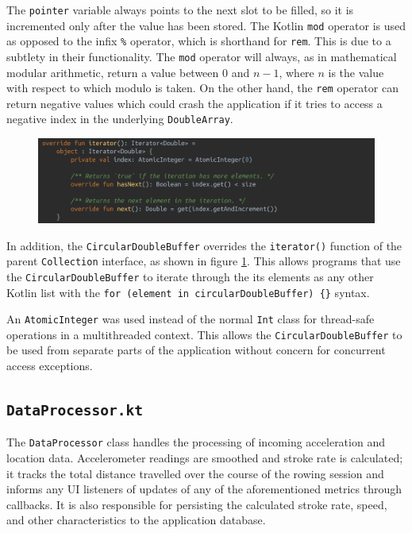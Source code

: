 \documentclass[11pt,twoside,a4paper]{report}
\newcommand\invisiblesection[1]{%
  \refstepcounter{section}%
  \addcontentsline{toc}{section}{\protect\numberline{\thesection}#1}%
  \sectionmark{#1}}
\begin{document}
The \texttt{pointer} variable always points to the next slot to be filled, so it is incremented only after the value has been stored. The Kotlin \texttt{mod} operator is used as opposed to the infix \texttt{\%} operator, which is shorthand for \texttt{rem}. This is due to a subtlety in their functionality. The \texttt{mod} operator will always, as in mathematical modular arithmetic, return a value between $0$ and $n-1$, where $n$ is the value with respect to which modulo is taken. On the other hand, the \texttt{rem} operator can return negative values which could crash the application if it tries to access a negative index in the underlying \texttt{DoubleArray}.

\begin{figure}[h!]
  \centering
  \includegraphics[width=1.0\textwidth]{code-CircularDoubleBuffer-iterator.png}
  \caption{}
  \label{fig:iterator}
\end{figure}

In addition, the \texttt{CircularDoubleBuffer} overrides the \texttt{iterator()} function of the parent \texttt{Collection} interface, as shown in figure \ref{fig:iterator}. This allows programs that use the \texttt{CircularDoubleBuffer} to iterate through the its elements as any other Kotlin list with the \texttt{for (element in circularDoubleBuffer)~\{\}} syntax. 

An \texttt{AtomicInteger} was used instead of the normal \texttt{Int} class for thread-safe operations in a multithreaded context. This allows the \texttt{CircularDoubleBuffer} to be used from separate parts of the application without concern for concurrent access exceptions.



\subsection{\texttt{DataProcessor.kt}}

The \texttt{DataProcessor} class handles the processing of incoming acceleration and location data. Accelerometer readings are smoothed and stroke rate is calculated; it tracks the total distance travelled over the course of the rowing session and informs any UI listeners of updates of any of the aforementioned metrics through callbacks. It is also responsible for persisting the calculated stroke rate, speed, and other characteristics to the application database.
\end{document}
